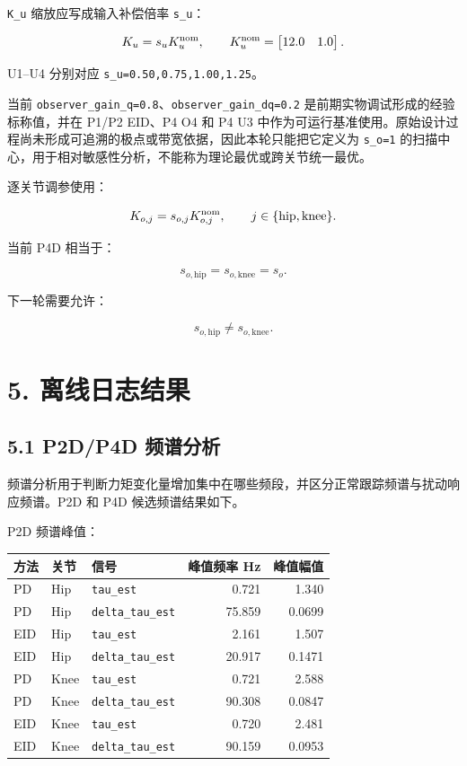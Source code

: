 \texttt{K\_u} 缩放应写成输入补偿倍率 \texttt{s\_u}：

\[
K_u=s_uK_u^{\rm nom},
\qquad
K_u^{\rm nom}=
\begin{bmatrix}
12.0 & 1.0
\end{bmatrix}.
\]

U1--U4 分别对应 \texttt{s\_u=0.50,0.75,1.00,1.25}。

当前 \texttt{observer\_gain\_q=0.8}、\texttt{observer\_gain\_dq=0.2} 是前期实物调试形成的经验标称值，并在 P1/P2 EID、P4 O4 和 P4 U3 中作为可运行基准使用。原始设计过程尚未形成可追溯的极点或带宽依据，因此本轮只能把它定义为 \texttt{s\_o=1} 的扫描中心，用于相对敏感性分析，不能称为理论最优或跨关节统一最优。

逐关节调参使用：

\[
K_{o,j}=s_{o,j}K_{o,j}^{\rm nom},
\qquad
j\in\{\mathrm{hip},\mathrm{knee}\}.
\]

当前 P4D 相当于：

\[
s_{o,\mathrm{hip}}=s_{o,\mathrm{knee}}=s_o.
\]

下一轮需要允许：

\[
s_{o,\mathrm{hip}}\ne s_{o,\mathrm{knee}}.
\]

\section{5. 离线日志结果}\label{ux79bbux7ebfux65e5ux5fd7ux7ed3ux679c}

\subsection{5.1 P2D/P4D 频谱分析}\label{p2dp4d-ux9891ux8c31ux5206ux6790}

频谱分析用于判断力矩变化量增加集中在哪些频段，并区分正常跟踪频谱与扰动响应频谱。P2D 和 P4D 候选频谱结果如下。

P2D 频谱峰值：

\begin{longtable}[]{@{}lllrr@{}}
\toprule\noalign{}
方法 & 关节 & 信号 & 峰值频率 Hz & 峰值幅值 \\
\midrule\noalign{}
\endhead
\bottomrule\noalign{}
\endlastfoot
PD & Hip & \texttt{tau\_est} & 0.721 & 1.340 \\
PD & Hip & \texttt{delta\_tau\_est} & 75.859 & 0.0699 \\
EID & Hip & \texttt{tau\_est} & 2.161 & 1.507 \\
EID & Hip & \texttt{delta\_tau\_est} & 20.917 & 0.1471 \\
PD & Knee & \texttt{tau\_est} & 0.721 & 2.588 \\
PD & Knee & \texttt{delta\_tau\_est} & 90.308 & 0.0847 \\
EID & Knee & \texttt{tau\_est} & 0.720 & 2.481 \\
EID & Knee & \texttt{delta\_tau\_est} & 90.159 & 0.0953 \\
\end{longtable}


